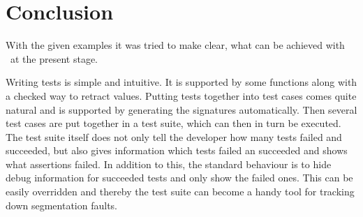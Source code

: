 %                                                                        
%                                                                        
%                                                                        
%                                                                        
%
\clearpage
\section{Conclusion}

With the given examples it was tried to make clear, what can be achieved with \projectname~at the present stage.

Writing tests is simple and intuitive. It is supported by some  functions along with a checked way to retract  values. Putting tests together into test cases comes quite natural and is supported by generating the signatures automatically. Then several test cases are put together in a test suite, which can then in turn be executed. The test suite itself does not only tell the developer how many tests failed and succeeded, but also gives information which tests failed an succeeded and shows what assertions failed. In addition to this, the standard behaviour is to hide debug information for succeeded tests and only show the failed ones. This can be easily overridden and thereby the test suite can become a handy tool for tracking down segmentation faults.
